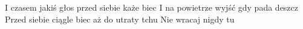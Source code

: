 \documentclass[../../../songbook.tex]{subfiles}
\begin{document}
\-\hspace{1cm} I czasem jakiś głos przed siebie każe biec		 \newline
\-\hspace{1cm} I na powietrze wyjść gdy pada deszcz		 \newline
\-\hspace{1cm} Przed siebie ciągle biec aż do utraty tchu		 \newline
\-\hspace{1cm} Nie wracaj nigdy tu		 \newline
\end{document}
